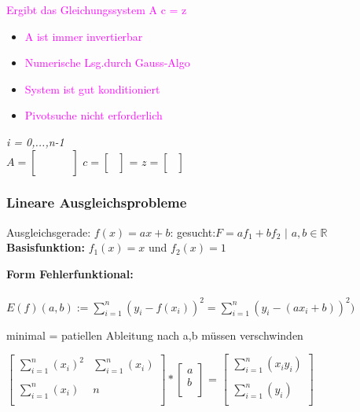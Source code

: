 \documentclass[../ZF_HM2.tex]{subfiles}
\begin{document}
\textcolor {magenta}{ Ergibt das Gleichungssystem \colorbox {yellow!30} {A} \colorbox {violet!30} {c} = \colorbox {orange!30} {z}}
\begin{itemize}
	\item \textcolor {magenta} {A ist immer invertierbar} 
	\item \textcolor {magenta} {Numerische Lsg.durch Gauss-Algo} 
	\item \textcolor {magenta} {System ist gut konditioniert} 
	\item \textcolor {magenta} {Pivotsuche nicht erforderlich} 
\end{itemize}
\textit{i = 0,...,n-1}\\
$A = $\colorbox {yellow!30}{$ \left[\begin {matrix} &  &  & \\ 
&  &  &\\
&  &  &\\
&  &  &\\
\end{matrix}\right]$} $c = $\colorbox {violet!30}{$ \left[\begin {matrix}  \\
\\
\\
\end{matrix}\right]$} = $z = $\colorbox {orange!30}{$ \left[\begin {matrix}  \\
\\
\\
\end{matrix}\right]$}


\subsubsection{Lineare Ausgleichsprobleme}
\colorbox {pink!30}{Ausgleichsgerade:} $f(x)=ax+b$:
\colorbox {pink!30} {gesucht:}$F=af_1+bf_2$ $|$ $a,b \in \mathbb{R}$
\textbf{Basisfunktion:} $f_1(x) = x$ und $f_2(x) = 1$



	\textbf{Form Fehlerfunktional:\\\\}
	\colorbox{magenta!30}{$E(f)(a,b):= \sum_{i=1}^{n}(y_i-f(x_i))^2 = \sum_{i=1}^{n}(y_i-(ax_i +b))^2 )$}
	 

\colorbox {pink!30}{minimal = } patiellen Ableitung nach a,b müssen verschwinden

$ \left[\begin {matrix}\sum_{i=1}^{n}(x_i)^2 & \sum_{i=1}^{n}(x_i)\\\\
\sum_{i=1}^{n}(x_i)&n\\
\end{matrix}\right] *
 \left[\begin {matrix}a\\
b\\
\end{matrix}\right]$
=
$ \left[\begin {matrix}\sum_{i=1}^{n}(x_iy_i) \\\\
\sum_{i=1}^{n}(y_i)\\
\end{matrix}\right]$
\end{document}
